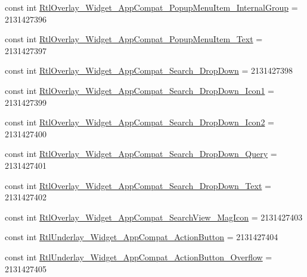 \begin{DoxyCompactItemize}
\item 
const int \mbox{\hyperlink{class_f_w_p_s___app_1_1_droid_1_1_resource_1_1_style_a452832a905ad69b1284f5c176c55aa98}{Rtl\+Overlay\+\_\+\+Widget\+\_\+\+App\+Compat\+\_\+\+Popup\+Menu\+Item\+\_\+\+Internal\+Group}} = 2131427396
\item 
const int \mbox{\hyperlink{class_f_w_p_s___app_1_1_droid_1_1_resource_1_1_style_a0ce7b649b33666dc8266a7f6d1bee19d}{Rtl\+Overlay\+\_\+\+Widget\+\_\+\+App\+Compat\+\_\+\+Popup\+Menu\+Item\+\_\+\+Text}} = 2131427397
\item 
const int \mbox{\hyperlink{class_f_w_p_s___app_1_1_droid_1_1_resource_1_1_style_ac4b3a31722b7ddc6a7477ca68959e665}{Rtl\+Overlay\+\_\+\+Widget\+\_\+\+App\+Compat\+\_\+\+Search\+\_\+\+Drop\+Down}} = 2131427398
\item 
const int \mbox{\hyperlink{class_f_w_p_s___app_1_1_droid_1_1_resource_1_1_style_afb556f9be3e109e97600ad023e39b17f}{Rtl\+Overlay\+\_\+\+Widget\+\_\+\+App\+Compat\+\_\+\+Search\+\_\+\+Drop\+Down\+\_\+\+Icon1}} = 2131427399
\item 
const int \mbox{\hyperlink{class_f_w_p_s___app_1_1_droid_1_1_resource_1_1_style_a3a7390d8911b0380b2c1491473181bef}{Rtl\+Overlay\+\_\+\+Widget\+\_\+\+App\+Compat\+\_\+\+Search\+\_\+\+Drop\+Down\+\_\+\+Icon2}} = 2131427400
\item 
const int \mbox{\hyperlink{class_f_w_p_s___app_1_1_droid_1_1_resource_1_1_style_a3d2842aefef8bffb2a6caa261262729c}{Rtl\+Overlay\+\_\+\+Widget\+\_\+\+App\+Compat\+\_\+\+Search\+\_\+\+Drop\+Down\+\_\+\+Query}} = 2131427401
\item 
const int \mbox{\hyperlink{class_f_w_p_s___app_1_1_droid_1_1_resource_1_1_style_aca62004aed8573f4ad796c20fd7242b2}{Rtl\+Overlay\+\_\+\+Widget\+\_\+\+App\+Compat\+\_\+\+Search\+\_\+\+Drop\+Down\+\_\+\+Text}} = 2131427402
\item 
const int \mbox{\hyperlink{class_f_w_p_s___app_1_1_droid_1_1_resource_1_1_style_a47bebac1019578647b52f63f189c7a77}{Rtl\+Overlay\+\_\+\+Widget\+\_\+\+App\+Compat\+\_\+\+Search\+View\+\_\+\+Mag\+Icon}} = 2131427403
\item 
const int \mbox{\hyperlink{class_f_w_p_s___app_1_1_droid_1_1_resource_1_1_style_af290d39b42712dcc0bd78cfeb7786b9f}{Rtl\+Underlay\+\_\+\+Widget\+\_\+\+App\+Compat\+\_\+\+Action\+Button}} = 2131427404
\item 
const int \mbox{\hyperlink{class_f_w_p_s___app_1_1_droid_1_1_resource_1_1_style_a39ba5d48609551ae90e06643f9d440eb}{Rtl\+Underlay\+\_\+\+Widget\+\_\+\+App\+Compat\+\_\+\+Action\+Button\+\_\+\+Overflow}} = 2131427405

\end{DoxyCompactItemize}
